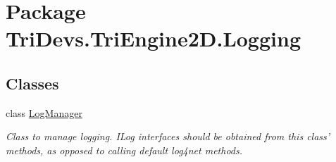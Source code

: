 \hypertarget{namespace_tri_devs_1_1_tri_engine2_d_1_1_logging}{\section{Package Tri\-Devs.\-Tri\-Engine2\-D.\-Logging}
\label{namespace_tri_devs_1_1_tri_engine2_d_1_1_logging}
}
\subsection*{Classes}
\begin{DoxyCompactItemize}
\item 
class \hyperlink{class_tri_devs_1_1_tri_engine2_d_1_1_logging_1_1_log_manager}{Log\-Manager}
\begin{DoxyCompactList}\small\item\em Class to manage logging. I\-Log interfaces should be obtained from this class' methods, as opposed to calling default log4net methods. \end{DoxyCompactList}\end{DoxyCompactItemize}
